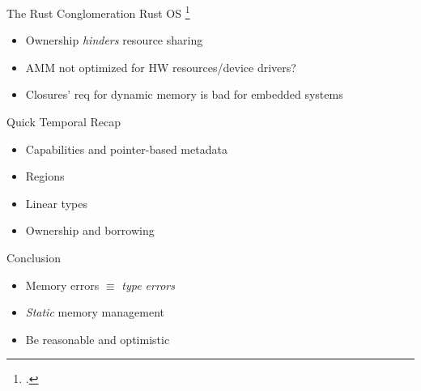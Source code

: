 \documentclass[aspectratio=169]{beamer}
\begin{document}
\begin{frame}{The Rust Conglomeration}
Rust OS \footcite{levy_ownership_2015}
    \begin{itemize}
        \item Ownership \emph{hinders} resource sharing
        \item AMM not optimized for HW resources/device drivers?
        \item Closures' req for dynamic memory is bad for embedded systems
    \end{itemize}
\end{frame}

\begin{frame}{Quick Temporal Recap}
    \begin{itemize}
      \item Capabilities and pointer-based metadata 
      \item Regions 
      \item Linear types 
      \item Ownership and borrowing 
    \end{itemize}
\end{frame}

\begin{frame}{Conclusion}
    \begin{itemize}[<+->]
        \item Memory errors $\equiv$ \emph{type errors}
        \item \emph{Static} memory management %
        \item Be reasonable and optimistic %
    \end{itemize}
\end{frame}
\end{document}

